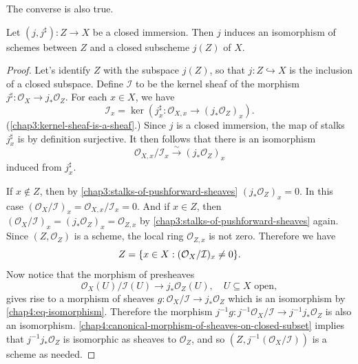 \documentclass[12pt]{book}
\theoremstyle{definition}
\DeclarePairedDelimiter{\Set}{\lbrace}{\rbrace}
\begin{document}
	The converse is also true.
	\begin{lemma}
		Let $(j, j^\sharp) \colon Z \to X$ be a closed immersion. Then $j$ induces an isomorphism of schemes between $Z$ and a closed subscheme $j(Z)$ of $X$.
	\end{lemma}
	\begin{proof}
		Let's identify $Z$ with the subspace $j(Z)$, so that $j \colon Z \hookrightarrow X$ is the inclusion of a closed subspace. Define $\mathcal{I}$ to be the kernel sheaf of the morphism $j^\sharp\colon \mathcal{O}_X \to j_\ast\mathcal{O}_Z$. For each $x \in X$, we have
		\begin{equation*}
			\mathcal{I}_x = \ker(j^\sharp_x \colon \mathcal{O}_{X, x} \to (j_\ast\mathcal{O}_Z)_{x}).
		\end{equation*}
		(\cref{chap3:kernel-sheaf-is-a-sheaf}.) Since $j$ is a closed immersion, the map of stalks $j^\sharp_x$ is by definition surjective. It then follows that there is an isomorphism
		\begin{equation}\label{chap4:eq-isomorphism}
			\mathcal{O}_{X, x}/\mathcal{I}_x \xrightarrow{\sim}  (j_\ast\mathcal{O}_Z)_{x} \tag{\ast}
		\end{equation}
		induced from $j^\sharp_x$.
		
		If $x \notin Z$, then by \cref{chap3:stalks-of-pushforward-sheaves} $(j_\ast\mathcal{O}_Z)_{x} = 0$. In this case $(\mathcal{O}_X/\mathcal{I})_x = \mathcal{O}_{X, x}/\mathcal{I}_x = 0$. And if $x \in Z$, then $(\mathcal{O}_X/\mathcal{I})_x = (j_\ast\mathcal{O}_Z)_{x} = \mathcal{O}_{Z, x}$ by \cref{chap3:stalks-of-pushforward-sheaves} again. Since $(Z, \mathcal{O}_Z)$ is a scheme, the local ring  $\mathcal{O}_{Z, x}$ is not zero. Therefore we have
		\begin{equation*}
			Z = \Set{x \in X : (\mathcal{O}_X/\mathcal{I})_x \neq 0}.
		\end{equation*}
		Now notice that the morphism of presheaves
		\begin{equation*}
			\mathcal{O}_X(U)/\mathcal{I}(U) \to j_\ast\mathcal{O}_Z(U),\quad U \subseteq X \text{ open},
		\end{equation*} 
		gives rise to a morphism of sheaves $g \colon \mathcal{O}_X/\mathcal{I} \to j_\ast\mathcal{O}_Z$ which is an isomorphism by \cref{chap4:eq-isomorphism}. Therefore the morphism $j^{-1}g \colon j^{-1}\mathcal{O}_X/\mathcal{I} \to j^{-1}j_\ast\mathcal{O}_Z$ is also an isomorphism. \cref{chap4:canonical-morphism-of-sheaves-on-closed-subset} implies that $j^{-1}j_\ast\mathcal{O}_Z$ is isomorphic as sheaves to $\mathcal{O}_Z$, and so $(Z, j^{-1}(\mathcal{O}_X/\mathcal{I}))$ is a scheme as needed.
	\end{proof}
	
\end{document}
